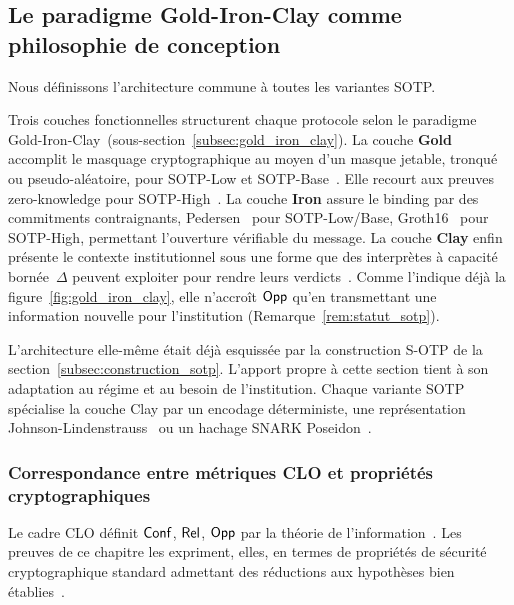\subsection{Le paradigme Gold-Iron-Clay comme philosophie de conception}
\label{subsec:philosophie_sotp}
\begin{sloppypar}
Nous d\'efinissons l'architecture commune \`a toutes les variantes SOTP.

Trois couches fonctionnelles structurent chaque protocole selon le paradigme
Gold-Iron-Clay~(sous-section~\ref{subsec:gold_iron_clay}).
La couche \textbf{Gold} accomplit le masquage cryptographique au moyen d'un masque jetable,
tronqu\'e ou pseudo-al\'eatoire, pour SOTP-Low et SOTP-Base~\cite{Shannon49,BlumMicali84}. Elle recourt aux preuves
zero-knowledge pour SOTP-High~\cite{GMR85,BenOr88}. La couche \textbf{Iron} assure le binding par des commitments
contraignants, Pedersen~\cite{Pedersen91,ChaumPedersen92} pour SOTP-Low/Base, Groth16~\cite{Groth16,BCTV14}
pour SOTP-High, permettant l'ouverture v\'erifiable du message. La couche
\textbf{Clay} enfin pr\'esente le contexte institutionnel sous une forme que des
interpr\`etes \`a capacit\'e born\'ee~$\Delta$ peuvent exploiter pour rendre leurs
verdicts~\cite{Simon82,Miller56}. Comme l'indique d\'ej\`a la figure~\ref{fig:gold_iron_clay}, elle n'accro\^it $\mathsf{Opp}$ qu'en transmettant
une information nouvelle pour l'institution (Remarque~\ref{rem:statut_sotp}).

L'architecture elle-m\^eme \'etait d\'ej\`a esquiss\'ee par la
construction S-OTP de la section~\ref{subsec:construction_sotp}. L'apport propre \`a cette section tient \`a son adaptation
au r\'egime et au besoin de l'institution. Chaque variante SOTP sp\'ecialise la couche Clay par un encodage
d\'eterministe, une repr\'esentation
Johnson-Lindenstrauss~\cite{JohnsonLindenstrauss84,DasguptaGupta03,Vempala05} ou un hachage SNARK
Poseidon~\cite{Groth16,Poseidon2019}.

\subsubsection{Correspondance entre m\'etriques CLO et propri\'et\'es cryptographiques}
\label{subsubsec:interpretation_operationnelle}

Le cadre CLO d\'efinit $\mathsf{Conf}$, $\mathsf{Rel}$, $\mathsf{Opp}$ par la th\'eorie de
l'information~\cite{MINKA2026CLO,Shannon48,CoverThomas06}. Les preuves de ce chapitre les
expriment, elles, en termes de propri\'et\'es de s\'ecurit\'e cryptographique standard admettant des
r\'eductions aux hypoth\`eses bien \'etablies~\cite{Goldreich01,KatzLindell14}.


\end{sloppypar}
